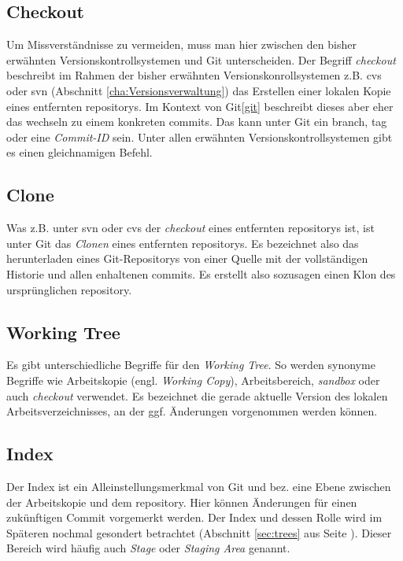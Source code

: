 \subsection{Checkout}\label{sec:checkout} Um Missverständnisse zu vermeiden,
muss man hier zwischen den bisher erwähnten Versionskontrollsystemen und Git
unterscheiden. Der Begriff \textit{checkout} beschreibt im Rahmen der bisher
erwähnten Versionskonrollsystemen z.B. \acrshort{cvs} oder \acrshort{svn}
(Abschnitt \ref{cha:Versionsverwaltung}) das Erstellen einer lokalen Kopie eines
entfernten \glspl{repository}. Im Kontext von Git\ref{git} beschreibt dieses
aber eher das wechseln zu einem konkreten \glspl{commit}. Das kann unter Git
ein \gls{branch}, \gls{tag} oder eine \textit{Commit-ID} sein. Unter allen
erwähnten Versionskontrollsystemen gibt es einen gleichnamigen Befehl.

\subsection{Clone}\label{sec:clone}
Was z.B. unter \acrshort{svn} oder \acrshort{cvs} der \textit{checkout} eines
entfernten \glspl{repository} ist, ist unter Git das \textit{Clonen} eines
entfernten \glspl{repository}. Es bezeichnet also das herunterladen eines
Git-Repositorys von einer Quelle mit der vollständigen Historie und allen
enhaltenen \glspl{commit}. Es erstellt also sozusagen einen Klon des
ursprünglichen \gls{repository}.\cite[S.~21]{gitosp}

\subsection{Working Tree}\label{sec:workingtree} Es gibt unterschiedliche
Begriffe für den \textit{Working Tree}. So werden synonyme Begriffe wie
Arbeitskopie (engl. \textit{Working Copy}), Arbeitsbereich, \textit{sandbox}
oder auch \textit{checkout} verwendet. Es bezeichnet die gerade aktuelle
Version des lokalen Arbeitsverzeichnisses, an der ggf.  Änderungen vorgenommen
werden können.\cite[S.~20]{gitosp}

\subsection{Index}\label{sec:index}
Der Index ist ein Alleinstellungsmerkmal von Git und bez. eine Ebene zwischen
der Arbeitskopie und dem \gls{repository}. Hier können Änderungen für einen
zukünftigen Commit vorgemerkt werden\cite[S.~20]{gitosp}. Der Index und dessen
Rolle wird im Späteren nochmal gesondert betrachtet (Abschnitt \ref{sec:trees}
aus Seite \pageref{sec:trees}). Dieser Bereich wird häufig auch \textit{Stage}
oder \textit{Staging Area} genannt\cite[S.~11]{progit}.

